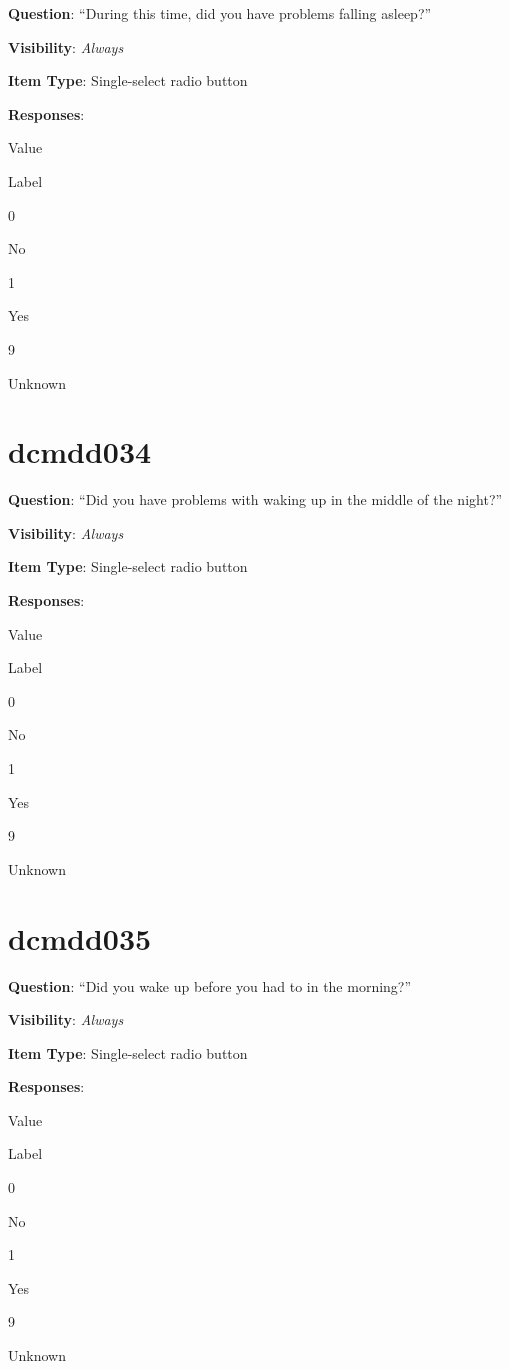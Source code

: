 \documentclass[]{book}
\begin{document}
\textbf{Question}: ``During this time, did you have problems falling asleep?''

\textbf{Visibility}: \emph{Always}

\textbf{Item Type}: Single-select radio button

\textbf{Responses}:

Value

Label

0

No

1

Yes

9

Unknown

\hypertarget{dcmdd034}{%
\section{dcmdd034}\label{dcmdd034}}

\textbf{Question}: ``Did you have problems with waking up in the middle of the night?''

\textbf{Visibility}: \emph{Always}

\textbf{Item Type}: Single-select radio button

\textbf{Responses}:

Value

Label

0

No

1

Yes

9

Unknown

\hypertarget{dcmdd035}{%
\section{dcmdd035}\label{dcmdd035}}

\textbf{Question}: ``Did you wake up before you had to in the morning?''

\textbf{Visibility}: \emph{Always}

\textbf{Item Type}: Single-select radio button

\textbf{Responses}:

Value

Label

0

No

1

Yes

9

Unknown
\end{document}
